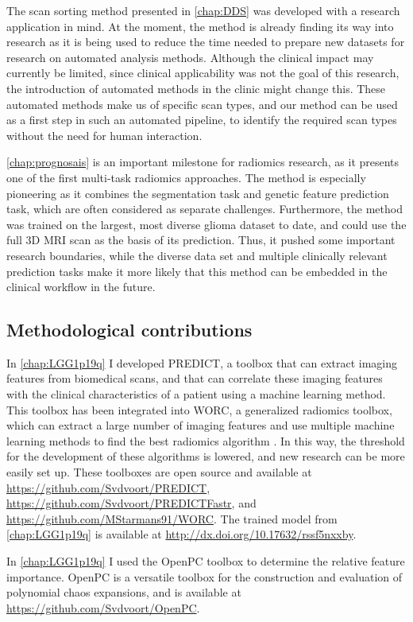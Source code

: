 The scan sorting method presented in \cref{chap:DDS} was developed with a research application in mind.
At the moment, the method is already finding its way into research as it is being used to reduce the time needed to prepare new datasets for research on automated analysis methods.
Although the clinical impact may currently be limited, since clinical applicability was not the goal of this research, the introduction of automated methods in the clinic might change this.
These automated methods make us of specific scan types, and our method can be used as a first step in such an automated pipeline, to identify the required scan types without the need for human interaction.

\cref{chap:prognosais} is an important milestone for radiomics research, as it presents one of the first multi-task radiomics approaches.
The method is especially pioneering as it combines the segmentation task and genetic feature prediction task, which are often considered as separate challenges.
Furthermore, the method was trained on the largest, most diverse glioma dataset to date, and could use the full 3D \gls{MRI} scan as the basis of its prediction.
Thus, it pushed some important research boundaries, while the diverse data set and multiple clinically relevant prediction tasks make it more likely that this method can be embedded in the clinical workflow in the future.


\subsection{Methodological contributions}
In \cref{chap:LGG1p19q} I developed PREDICT, a toolbox that can extract imaging features from biomedical scans, and that can correlate these imaging features with the clinical characteristics of a patient using a machine learning method.
This toolbox has been integrated into WORC, a generalized radiomics toolbox, which can extract a large number of imaging features and use multiple machine learning methods to find the best radiomics algorithm \autocite{mstarmans2020worc}.
In this way, the threshold for the development of these algorithms is lowered, and new research can be more easily set up.
These toolboxes are open source and available at \url{https://github.com/Svdvoort/PREDICT}, \url{https://github.com/Svdvoort/PREDICTFastr}, and \url{https://github.com/MStarmans91/WORC}.
The trained model from \cref{chap:LGG1p19q} is available at \url{http://dx.doi.org/10.17632/rssf5nxxby}.

In \cref{chap:LGG1p19q} I used the OpenPC toolbox to determine the relative feature importance.
OpenPC is a versatile toolbox for the construction and evaluation of polynomial chaos expansions, and is available at \url{https://github.com/Svdvoort/OpenPC}.

